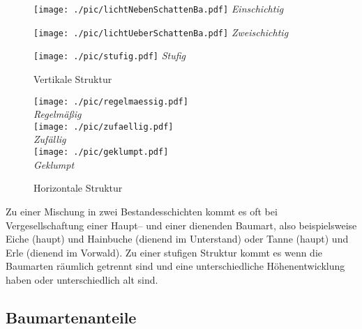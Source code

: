 \documentclass[twocolumn]{scrartcl}
\begin{document}
\begin{figure}[htbp]
  \centering
  \begin{minipage}{0.9\linewidth}
    \begin{minipage}{0.3\linewidth}
      \texttt{[image: ./pic/lichtNebenSchattenBa.pdf]}
      \textit{Einschichtig}
    \end{minipage}\hfill
    \begin{minipage}{0.65\linewidth}
      \texttt{[image: ./pic/lichtUeberSchattenBa.pdf]}
      \null\hfill\textit{Zweischichtig}
    \end{minipage}
  \end{minipage}
  \begin{minipage}{0.9\linewidth}
    \centering
    \texttt{[image: ./pic/stufig.pdf]}
    \textit{Stufig}
  \end{minipage}
  \caption{Vertikale Struktur}
  \label{fig:vertikaleStruktur}
\end{figure}

\begin{figure}[htbp]
  \centering
  \texttt{[image: ./pic/regelmaessig.pdf]}\\
  \textit{Regelmäßig}\\[.5em]
  \texttt{[image: ./pic/zufaellig.pdf]}\\
  \textit{Zufällig}\\[.5em]
  \texttt{[image: ./pic/geklumpt.pdf]}\\
  \textit{Geklumpt}
  \caption{Horizontale Struktur}
  \label{fig:horizontaletruktur}
\end{figure}

Zu einer Mischung in zwei Bestandesschichten kommt es oft bei
Vergesellschaftung einer Haupt-- und einer dienenden Baumart, also
beispielsweise Eiche (haupt) und Hainbuche (dienend im Unterstand)
oder Tanne (haupt) und Erle (dienend im Vorwald). Zu einer stufigen
Struktur kommt es wenn die Baumarten räumlich getrennt sind und eine
unterschiedliche Höhenentwicklung haben oder unterschiedlich alt sind.

\subsection{Baumartenanteile}
\label{ssec:Baumartenanteile}
\end{document}
